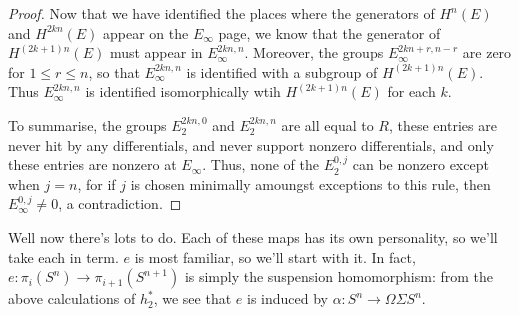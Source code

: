 \documentclass{article}
\newcommand{\Z}{\mathbb{Z}}
\begin{document}
\begin{proof}
Now that we have identified the places where the generators of $H^n(E)$ and $H^{2kn}(E)$ appear on the $E_{\infty}$ page, we know that the generator of $H^{(2k+1)n}(E)$ must appear in $E_{\infty}^{2kn,n}$. Moreover, the groups $E_\infty^{2kn+r,n-r}$ are zero for $1\leq r\leq n$, so that $E_{\infty}^{2kn,n}$ is identified with a subgroup of $H^{(2k+1)n}(E)$. Thus $E_\infty^{2kn,n}$ is identified isomorphically wtih $H^{(2k+1)n}(E)$ for each $k$.

To summarise, the groups $E_2^{2kn,0}$ and $E_2^{2kn,n}$ are all equal to $R$, these entries are never hit by any differentials, and never support nonzero differentials, and only these entries are nonzero at $E_\infty$. Thus, none of the $E_2^{0,j}$ can be nonzero except when $j=n$, for if $j$ is chosen minimally amoungst exceptions to this rule, then $E_\infty^{0,j}\neq0$, a contradiction.
%
%
%
\end{proof}

Well now there's lots to do.  Each of these maps has its own personality, so we'll take each in term.  $e$ is most familiar, so we'll start with it. In fact, $e:\pi_i(S^n)\to\pi_{i+1}(S^{n+1})$ is simply the suspension homomorphism: from the above calculations of $h_2^*$, we see that $e$ is induced by $\alpha:S^n\to \Omega\Sigma S^n$.
\end{document}
